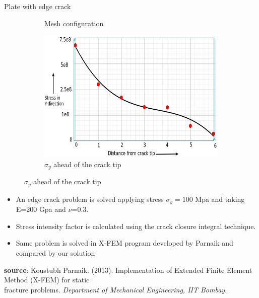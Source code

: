 \documentclass{beamer}
\begin{document}
\begin{frame}[t,fragile]{Plate with edge crack}
\begin{figure}
\begin{subfigure}{.2\textwidth}
            \caption{\scriptsize Mesh configuration}
    \end{subfigure}
    \begin{subfigure}{.5\textwidth}
    \vspace{10pt}
        \includegraphics[scale=.25]{z}
        \vspace{-5pt}
         \caption{\scriptsize $\sigma_y$ ahead of the crack tip}
    \end{subfigure}
\end{figure}
    \vspace{-10pt}
\begin{itemize}
        \scriptsize
    \item An edge crack problem is solved applying stress $\sigma_y=100$ Mpa and taking E=200 Gpa and $\nu$=0.3.
    \item Stress intensity factor is calculated using the crack closure integral technique. 
    \item Same problem is solved in X-FEM program developed by Parnaik and compared by our solution 
\end{itemize}
\tiny
   \hspace{15pt}
   \textbf{source}:  Koustubh Parnaik. (2013). Implementation of Extended Finite Element Method (X-FEM) for static\\
   \hspace{15pt}fracture problems.
\emph{Department of Mechanical Engineering, IIT Bombay}.

\end{frame}
\end{document}
